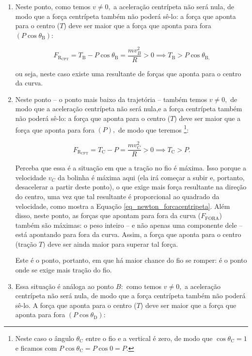 \begin{enumerate}
\begin{enumerate}
     \item[B)] Neste ponto, como temos $v \neq 0,$ a aceleração centrípeta não será nula, de modo que a força centrípeta também não poderá sê-lo: a força que aponta para o centro ($T$) deve ser maior que a força que aponta para fora $(P \cos \theta_{\text{B}})$:

      $$ F_{\text{R}_\text{CPT}}=T_{\text{B}} - P \cos \theta_{\text{B}} = \dfrac{m v_B^2}{R} > 0 \implies \boxed{ T_{\text{B}} > P \cos \theta_{\text{B,}}}$$

     \noindent ou seja, neste caso existe uma resultante de forças que aponta para o centro da curva.

     \item[C)] Neste ponto -- o ponto mais baixo da trajetória -- também temos $v \neq 0,$ de modo que a aceleração centrípeta não será nula,e a força centrípeta também não poderá sê-lo: a força que aponta para o centro ($T$) deve ser maior que a força que aponta para fora $(P), $ de modo que teremos \footnote{Neste caso o ângulo $\theta_{\text{C}}$ entre o fio e a vertical é zero, de modo que $\cos \theta_{\text{C}}=1$ e ficamos com $P \cos \theta_{\text{C}} = P \cos 0 = P.$ }:

      $$ F_{\text{R}_\text{CPT}}=T_{\text{C}} - P = \dfrac{m v_C^2}{R} > 0 \implies \boxed{ T_{\text{C}} > P.}$$

      Perceba que essa é a situação em que a tração no fio é máxima. Isso porque a velocidade $v_C$ da bolinha é máxima aqui (ela irá começar a subir e, portanto, desacelerar a partir deste ponto), o que exige mais força resultante na direção do centro, uma vez que tal resultante é proporcional ao quadrado da velocidade, como mostra a Equação \eqref{eq_newton_forcacentripeta}. Além disso, neste ponto, as forças que apontam para fora da curva ($F_{\text{FORA}}$) também são máximas: o peso inteiro -- e não apenas uma componente dele -- está apontando para fora da curva. Assim, a força que aponta para o centro (tração $T)$ deve ser ainda maior para superar tal força.

      Este é o ponto, portanto, em que há maior chance do fio se romper: é o ponto onde se exige mais tração do fio.

     \item [D)] Essa situação é análoga ao ponto $B:$ como temos $v \neq 0,$ a aceleração centrípeta não será nula, de modo que a força centrípeta também não poderá sê-lo. A força que aponta para o centro ($T$) deve ser maior que a força que aponta para fora $(P \cos \theta_{\text{D}})$:


\end{enumerate}
\end{enumerate}
